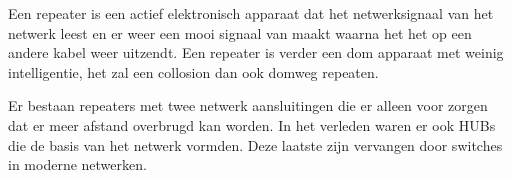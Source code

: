 Een repeater is een actief elektronisch apparaat dat het netwerksignaal van het netwerk leest en er weer een mooi signaal van maakt waarna het het op een andere kabel weer uitzendt. Een repeater is verder een dom apparaat met weinig intelligentie, het zal een collosion dan ook domweg repeaten.

Er bestaan repeaters met twee netwerk aansluitingen die er alleen voor zorgen dat er meer afstand overbrugd kan worden. In het verleden waren er ook HUBs die de basis van het netwerk vormden. Deze laatste zijn vervangen door switches in moderne netwerken.

